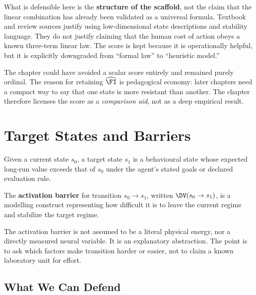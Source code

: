 \begin{discussion}
What is defensible here is the \textbf{structure of the scaffold}, not the
claim that the linear combination has already been validated as a universal
formula. Textbook and review sources justify using low-dimensional state
descriptions and stability language. They do not justify claiming that the
human cost of action obeys a known three-term linear law. The score is kept
because it is operationally helpful, but it is explicitly downgraded from
``formal law'' to ``heuristic model.''
\end{discussion}

\begin{remark}
The chapter could have avoided a scalar score entirely and remained purely
ordinal. The reason for retaining $\widehat{\FI}$ is pedagogical economy: later
chapters need a compact way to say that one state is more resistant than
another. The chapter therefore licenses the score as a \emph{comparison aid},
not as a deep empirical result.
\end{remark}

\section{Target States and Barriers}

\begin{definition}
Given a current state $s_0$, a target state $s_1$ is a behavioural state whose
expected long-run value exceeds that of $s_0$ under the agent's stated goals
or declared evaluation rule.
\end{definition}

\begin{definition}
The \textbf{activation barrier} for transition $s_0 \to s_1$, written
$\DV(s_0 \to s_1)$, is a modelling construct representing how difficult it is
to leave the current regime and stabilize the target regime.
\end{definition}

\begin{remark}
The activation barrier is not assumed to be a literal physical energy, nor a
directly measured neural variable. It is an explanatory abstraction. The point
is to ask which factors make transition harder or easier, not to claim a known
laboratory unit for effort.
\end{remark}

\subsection{What We Can Defend}

